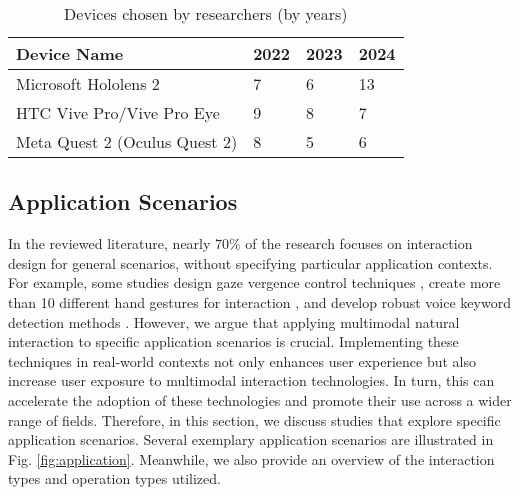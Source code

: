 \documentclass[review]{fcs}
\newcommand{\revise}[2]{\textcolor[rgb]{0,0,0}{#2}}
\newcommand{\ccite}{\textcolor[rgb]{0,0,1}{[cite]}}
\begin{document}
\begin{table}[t]
    \centering
    \renewcommand\arraystretch{1.2}
    \caption{\revise{}{Devices chosen by researchers (by years)}}
    \begin{tabular}{m{2.5cm}<{\centering}|m{1.5cm}<{\centering}|m{1.5cm}<{\centering}|m{1.5cm}<{\centering}}
    \hline
         Device Name &  2022 & 2023 & 2024
        \\ \hline
         Microsoft Hololens 2 & 7 & 6 & 13
        \\ \hline
        HTC Vive Pro/Vive Pro Eye & 9 & 8 & 7
        \\ \hline
        Meta Quest 2 (Oculus Quest 2) & 8 & 5 & 6
        \\ \hline
        
   
    \end{tabular}
    \label{devices}
\end{table}

\subsection{Application Scenarios}  
\label{Appl.}

In the reviewed literature, nearly 70\% of the research focuses on interaction design for general scenarios, without specifying particular application contexts. For example, some studies design gaze vergence control techniques \cite{DBLP:conf/chi/SidenmarkCNLPG23, DBLP:journals/tvcg/WangZ022, DBLP:conf/chi/ZhangCSS24}, create more than 10 different hand gestures for interaction \cite{DBLP:conf/chi/PeiCLZ22, DBLP:journals/tvcg/SongDK23}, and develop robust voice keyword detection methods \cite{DBLP:journals/tvcg/CaiML24, DBLP:conf/chi/ZhangLHWLGZ23}.
However, we argue that applying multimodal natural interaction to specific application scenarios is crucial. 
Implementing these techniques in real-world contexts not only enhances user experience but also increase user exposure to multimodal interaction technologies.
In turn, this can accelerate the adoption of these technologies and promote their use across a wider range of fields.
Therefore, in this section, we discuss studies that explore specific application scenarios. \revise{}{Several exemplary application scenarios are illustrated in Fig. \ref{fig:application}. Meanwhile, we also provide an overview of the interaction types and operation types utilized.}
\end{document}
